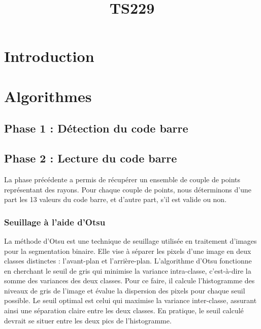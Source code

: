 \documentclass{rapport}
\title{TS229}
\begin{document}

\fairemarges %
\fairepagedegarde %
\newpage
\tabledematieres %
\newpage

\section{Introduction}

\section{Algorithmes}

\subsection{Phase 1 : Détection du code barre}
\subsection{Phase 2 : Lecture du code barre}

La phase précédente a permis de récupérer un ensemble de couple de points représentant des rayons. 
Pour chaque couple de points, nous déterminons d'une part les 13 valeurs du code barre, et d'autre part, s'il est valide ou non.

\subsubsection*{Seuillage à l'aide d'Otsu}
La méthode d'Otsu est une technique de seuillage utilisée en traitement d'images pour la segmentation binaire. 
Elle vise à séparer les pixels d'une image en deux classes distinctes : l'avant-plan et l'arrière-plan. 
L'algorithme d'Otsu fonctionne en cherchant le seuil de gris qui minimise la variance intra-classe, c'est-à-dire la somme des variances des deux classes. 
Pour ce faire, il calcule l'histogramme des niveaux de gris de l'image et évalue la dispersion des pixels pour chaque seuil possible. 
Le seuil optimal est celui qui maximise la variance inter-classe, assurant ainsi une séparation claire entre les deux classes. 
En pratique, le seuil calculé devrait se situer entre les deux pics de l'histogramme.
\end{document}
